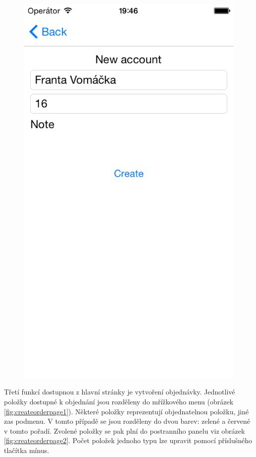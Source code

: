 \begin{figure}
\begin{minipage}{.5\textwidth}
  \label{fig:createaccountpage1}
\end{minipage}%
\begin{minipage}{.5\textwidth}
  \centering
  \includegraphics[width=.95\textwidth]{createaccount.png}
  \label{fig:createaccountpage2}
\end{minipage}
\end{figure}

Třetí funkcí dostupnou z hlavní stránky je vytvoření objednávky.
Jednotlivé položky dostupné k objednání jsou rozděleny do mřížkového menu (obrázek \ref{fig:createorderpage1}).
Některé položky reprezentují objednatelnou položku, jiné zas podmenu.
V tomto případě se jsou rozděleny do dvou barev: zelené a červené v tomto pořadí.
Zvolené položky se pak plní do postranního panelu viz obrázek \ref{fig:createorderpage2}.
Počet položek jednoho typu lze upravit pomocí příslušného tlačítka mínus.

